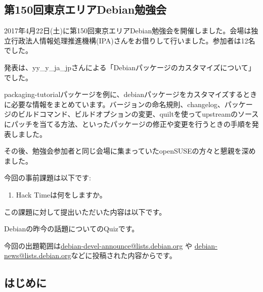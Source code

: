 \documentclass[mingoth,a4paper]{jsarticle}
\begin{document}

\subsection{第150回東京エリアDebian勉強会}

2017年4月22日(土)に第150回東京エリアDebian勉強会を開催しました。会場は独立行政法人情報処理推進機構(IPA)さんをお借りして行いました。参加者は12名でした。

発表は、yy\_y\_ja\_jpさんによる「Debianパッケージのカスタマイズについて」でした。

packaging-tutorialパッケージを例に、debianパッケージをカスタマイズするときに必要な情報をまとめています。バージョンの命名規則、changelog、パッケージのビルドコマンド、ビルドオプションの変更、quiltを使ってupstreamのソースにパッチを当てる方法、といったパッケージの修正や変更を行うときの手順を発表しました。

その後、勉強会参加者と同じ会場に集まっていたopenSUSEの方々と懇親を深めました。



今回の事前課題は以下です:
\begin{enumerate}
  \item Hack Timeは何をしますか。
\end{enumerate}
この課題に対して提出いただいた内容は以下です。
\begin{multicols}{2}
{\small

}
\end{multicols}


Debianの昨今の話題についてのQuizです。

今回の出題範囲は\url{debian-devel-announce@lists.debian.org} や \url{debian-news@lists.debian.org}などに投稿された内容からです。

\begin{multicols}{2}

\end{multicols}




\subsection{はじめに}
\end{document}
